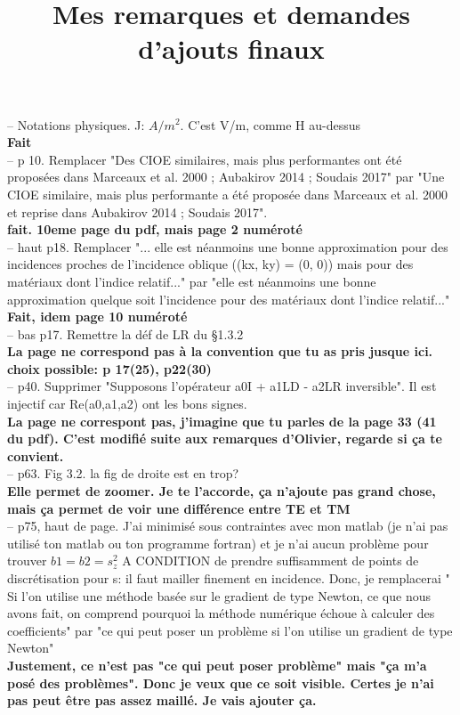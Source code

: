 \documentclass{article}
\title{Mes remarques et demandes d'ajouts finaux}
\date{}
\newcommand{\rep}[1]{\\\textbf{\color{green!50!black}#1}\\}
\newcommand{\que}[1]{\\\textbf{\color{red!50!black}#1}\\}
\begin{document}
\maketitle

-- Notations physiques.  J: \(A/m^2\). C'est  V/m, comme H au-dessus
\rep{Fait}

-- p 10. Remplacer "Des CIOE similaires, mais plus performantes ont été proposées dans Marceaux et al. 2000 ; Aubakirov 2014 ; Soudais 2017" par  "Une CIOE similaire, mais plus performante a été proposée dans Marceaux et al. 2000 et reprise dans  Aubakirov 2014 ;      Soudais 2017".
\rep{fait. 10eme page du pdf, mais page 2 numéroté}

-- haut p18. Remplacer "... elle est néanmoins une bonne approximation pour des incidences proches de l’incidence oblique ((kx, ky) = (0, 0)) mais pour des matériaux dont l’indice relatif..." par "elle est néanmoins une bonne approximation quelque soit l'incidence pour des matériaux dont l’indice relatif..." 
\rep{Fait, idem page 10 numéroté}

-- bas p17. Remettre la déf de LR du §1.3.2
\que{La page ne correspond pas à la convention que tu as pris jusque ici. choix possible: p 17(25), p22(30) }

-- p40. Supprimer "Supposons l’opérateur a0I + a1LD - a2LR inversible". Il est injectif car Re(a0,a1,a2) ont les bons signes.
\que{La page ne correspont pas, j'imagine que tu parles de la page 33 (41 du pdf). C'est modifié suite aux remarques d'Olivier, regarde si ça te convient.}

-- p63. Fig 3.2. la fig de droite est en trop?
\rep{Elle permet de zoomer. Je te l'accorde, ça n'ajoute pas grand chose, mais ça permet de voir une différence entre TE et TM}

-- p75, haut de page. J'ai minimisé sous contraintes avec mon matlab (je n'ai pas utilisé ton matlab ou ton programme fortran) et je n'ai aucun problème pour trouver \(b1=b2=s_z^2\) A CONDITION de prendre suffisamment de points de discrétisation pour s: il faut mailler finement en incidence. Donc, je remplacerai " Si l’on utilise une méthode basée sur le gradient de type Newton, ce que nous avons fait, on comprend pourquoi la méthode numérique échoue à calculer des coefficients" par "ce qui peut poser un problème si l'on utilise un  gradient de type Newton"
\que{Justement, ce n'est pas "ce qui peut poser problème" mais "ça m'a posé des problèmes". Donc je veux que ce soit visible. Certes je n'ai pas peut être pas assez maillé. Je vais ajouter ça.}
\end{document}
